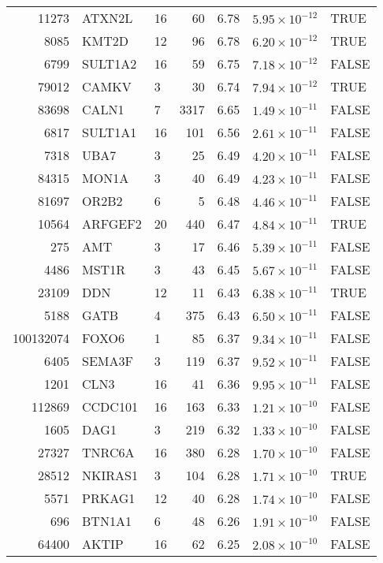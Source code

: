 \begin{table}[ht]
\begin{adjustbox}{totalheight=10in}
\begin{tabular}{rllrrrl}
  11273 & ATXN2L & 16 &  60 & 6.78 & $5.95 \times 10^{-12}$ & TRUE \\ 
  8085 & KMT2D & 12 &  96 & 6.78 & $6.20 \times 10^{-12}$ & TRUE \\ 
  6799 & SULT1A2 & 16 &  59 & 6.75 & $7.18 \times 10^{-12}$ & FALSE \\ 
  79012 & CAMKV & 3 &  30 & 6.74 & $7.94 \times 10^{-12}$ & TRUE \\ 
  83698 & CALN1 & 7 & 3317 & 6.65 & $1.49 \times 10^{-11}$ & FALSE \\ 
  6817 & SULT1A1 & 16 & 101 & 6.56 & $2.61 \times 10^{-11}$ & FALSE \\ 
  7318 & UBA7 & 3 &  25 & 6.49 & $4.20 \times 10^{-11}$ & FALSE \\ 
  84315 & MON1A & 3 &  40 & 6.49 & $4.23 \times 10^{-11}$ & FALSE \\ 
  81697 & OR2B2 & 6 &   5 & 6.48 & $4.46 \times 10^{-11}$ & FALSE \\ 
  10564 & ARFGEF2 & 20 & 440 & 6.47 & $4.84 \times 10^{-11}$ & TRUE \\ 
  275 & AMT & 3 &  17 & 6.46 & $5.39 \times 10^{-11}$ & FALSE \\ 
  4486 & MST1R & 3 &  43 & 6.45 & $5.67 \times 10^{-11}$ & FALSE \\ 
  23109 & DDN & 12 &  11 & 6.43 & $6.38 \times 10^{-11}$ & TRUE \\ 
  5188 & GATB & 4 & 375 & 6.43 & $6.50 \times 10^{-11}$ & FALSE \\ 
  100132074 & FOXO6 & 1 &  85 & 6.37 & $9.34 \times 10^{-11}$ & FALSE \\ 
  6405 & SEMA3F & 3 & 119 & 6.37 & $9.52 \times 10^{-11}$ & FALSE \\ 
  1201 & CLN3 & 16 &  41 & 6.36 & $9.95 \times 10^{-11}$ & FALSE \\ 
  112869 & CCDC101 & 16 & 163 & 6.33 & $1.21 \times 10^{-10}$ & FALSE \\ 
  1605 & DAG1 & 3 & 219 & 6.32 & $1.33 \times 10^{-10}$ & FALSE \\ 
  27327 & TNRC6A & 16 & 380 & 6.28 & $1.70 \times 10^{-10}$ & FALSE \\ 
  28512 & NKIRAS1 & 3 & 104 & 6.28 & $1.71 \times 10^{-10}$ & TRUE \\ 
  5571 & PRKAG1 & 12 &  40 & 6.28 & $1.74 \times 10^{-10}$ & FALSE \\ 
  696 & BTN1A1 & 6 &  48 & 6.26 & $1.91 \times 10^{-10}$ & FALSE \\ 
  64400 & AKTIP & 16 &  62 & 6.25 & $2.08 \times 10^{-10}$ & FALSE \\ 

\end{tabular}
\end{adjustbox}
\end{table}

